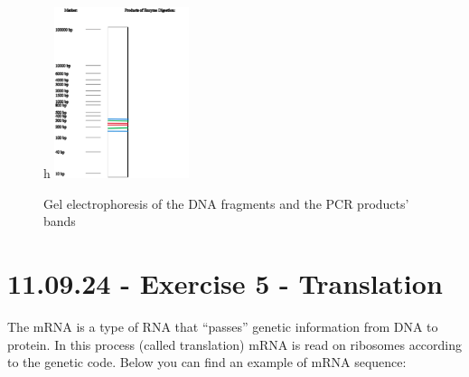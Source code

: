 \begin{figure}{h}
    \centering
    \includegraphics[width=0.35\textwidth]{Figures/Exc4sub6.png}
    \caption{Gel electrophoresis of the DNA fragments and the PCR products' bands}
    \label{fig:Exc4sub6}
\end{figure}

\section{11.09.24 - Exercise 5 - Translation}
The mRNA is a type of RNA that “passes” genetic information from DNA to protein. In this process (called translation) mRNA is read on ribosomes according to the genetic code. Below you can find an example of mRNA sequence:

\vspace{1em}

